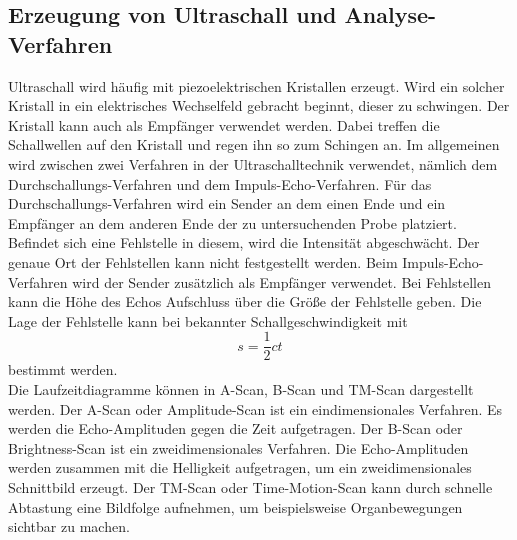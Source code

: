 \subsection{Erzeugung von Ultraschall und Analyse-Verfahren}
Ultraschall wird häufig mit piezoelektrischen Kristallen erzeugt.
Wird ein solcher Kristall in ein elektrisches Wechselfeld gebracht beginnt, dieser zu schwingen.
Der Kristall kann auch als Empfänger verwendet werden. Dabei treffen die Schallwellen auf den Kristall und regen ihn so zum Schingen an.
Im allgemeinen wird zwischen zwei Verfahren in der Ultraschalltechnik verwendet, nämlich dem Durchschallungs-Verfahren und dem Impuls-Echo-Verfahren.
Für das Durchschallungs-Verfahren wird ein Sender an dem einen Ende und ein Empfänger an dem anderen Ende der zu untersuchenden Probe platziert.
Befindet sich eine Fehlstelle in diesem, wird die Intensität abgeschwächt.
Der genaue Ort der Fehlstellen kann nicht festgestellt werden.
Beim Impuls-Echo-Verfahren wird der Sender zusätzlich als Empfänger verwendet.
Bei Fehlstellen kann die Höhe des Echos Aufschluss über die Größe der Fehlstelle geben.
Die Lage der Fehlstelle kann bei bekannter Schallgeschwindigkeit mit
\begin{equation}
  \label{eq:schall}
  s= \frac{1}{2}ct
\end{equation}
bestimmt werden.
\\Die Laufzeitdiagramme können in A-Scan, B-Scan und TM-Scan dargestellt werden.
Der A-Scan oder Amplitude-Scan ist ein eindimensionales Verfahren.
Es werden die Echo-Amplituden gegen die Zeit aufgetragen.
Der B-Scan oder Brightness-Scan ist ein zweidimensionales Verfahren.
Die Echo-Amplituden werden zusammen mit die Helligkeit aufgetragen, um ein zweidimensionales Schnittbild erzeugt.
Der TM-Scan oder Time-Motion-Scan kann durch schnelle Abtastung eine Bildfolge aufnehmen, um beispielsweise Organbewegungen sichtbar zu machen.

